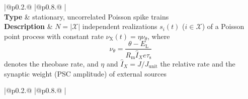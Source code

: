 \documentclass[10pt,a4paper,twoside,american]{article}
\newcommand{\ext}{\text{X}}   %
\newcommand{\RM}{R_\text{m}}
\newcommand{\tauS}{\tau_\text{s}}
\newcommand{\Xpop}{\mathcal{X}} %
\begin{document}
\begin{table}[H]
\begin{tabular}{
  |@{\hspace*{\marg}}p{}@{\hspace*{\marg}}
  |@{\hspace*{\marg}}p{}@{\hspace*{\marg}}
  |}
  \hline 
  \\
\hline 
\textbf{Type} & stationary, uncorrelated Poisson spike trains\\
\hline 
  \textbf{Description} & $N=|\Xpop|$ independent realizations $s_i(t)$ ($i\in\Xpop$) of a Poisson point process with constant rate \mbox{$\nu_\ext(t)=\eta\nu_\theta$}, where
                         \begin{equation*}
                          \label{eq:rheobase_rate_LIF_alpha}
                           \nu_\theta=\frac{\theta-E_\text{L}}{\RM{}\hat{I}_X{}e\tauS}
                         \end{equation*}
                         denotes the rheobase rate, and $\eta$ and $\hat{I}_X=J/J_\text{unit}$ the relative rate and the synaptic weight (PSC amplitude) of external sources\\
\hline 
\end{tabular}
\begin{tabular}{
  |@{\hspace*{\marg}}p{}@{\hspace*{\marg}}
  |@{\hspace*{\marg}}p{}@{\hspace*{\marg}}
  |}
  \hline 
  \\

\end{tabular}
\end{table}
\end{document}
